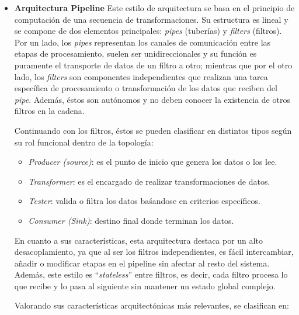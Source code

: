 \begin{itemize}
    Como conclusión, se puede destacar que esta arquitectura es ideal para aplicaciones pequeñas y sencillas donde el 
    presupuesto es limitado y la complejidad no justifica sistemas distribuidos más costosos.

    \item \textbf{Arquitectura Pipeline}
    \newline
    Este estilo de arquitectura se basa en el principio de computación de una secuencia de transformaciones. Su estructura
    es lineal y se compone de dos elementos principales: \textit{pipes} (tuberías) y \textit{filters} (filtros). Por un lado,
    los \textit{pipes} representan los canales de comunicación entre las etapas de procesamiento, suelen ser unidireccionales 
    y su función es puramente el transporte de datos de un filtro a otro; mientras que por el otro lado, los \textit{filters}
    son componentes independientes que realizan una tarea específica de procesamiento o transformación de los datos que reciben 
    del \textit{pipe}. Además, éstos son autónomos y no deben conocer la existencia de otros filtros en la cadena.

    Continuando con los filtros, éstos se pueden clasificar en distintos tipos según su rol funcional dentro de la topología:

    \begin{itemize}
        \item \textit{Producer (source)}: es el punto de inicio que genera los datos o los lee.
        \item \textit{Transformer}: es el encargado de realizar transformaciones de datos.
        \item \textit{Tester}: valida o filtra los datos baśandose en criterios específicos.
        \item \textit{Consumer (Sink)}: destino final donde terminan los datos.
    \end{itemize}

    En cuanto a sus características, esta arquitectura destaca por un alto desacoplamiento, ya que al ser los filtros
    independientes, es fácil intercambiar, añadir o modificar etapas en el pipeline sin afectar al resto del sistema. 
    Además, este estilo es ``\textit{stateless}'' entre filtros, es decir, cada filtro procesa lo que recibe y lo pasa 
    al siguiente sin mantener un estado global complejo.

    Valorando sus características arquitectónicas más relevantes, se clasifican en:


\end{itemize}

